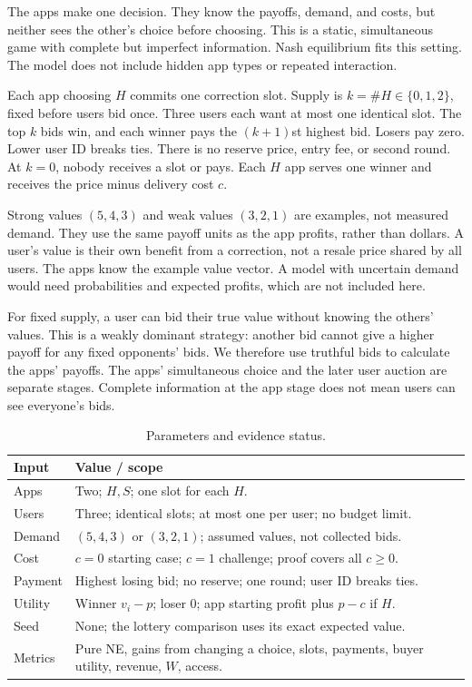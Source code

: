 The apps make one decision. They know the payoffs, demand, and costs, but neither sees the other's choice before choosing. This is a static, simultaneous game with complete but imperfect information. Nash equilibrium fits this setting. The model does not include hidden app types or repeated interaction.

Each app choosing $H$ commits one correction slot. Supply is $k=\#H\in\{0,1,2\}$, fixed before users bid once. Three users each want at most one identical slot. The top $k$ bids win, and each winner pays the $(k+1)$st highest bid. Losers pay zero. Lower user ID breaks ties. There is no reserve price, entry fee, or second round. At $k=0$, nobody receives a slot or pays. Each $H$ app serves one winner and receives the price minus delivery cost $c$.

Strong values $(5,4,3)$ and weak values $(3,2,1)$ are examples, not measured demand. They use the same payoff units as the app profits, rather than dollars. A user's value is their own benefit from a correction, not a resale price shared by all users. The apps know the example value vector. A model with uncertain demand would need probabilities and expected profits, which are not included here.

For fixed supply, a user can bid their true value without knowing the others' values. This is a weakly dominant strategy: another bid cannot give a higher payoff for any fixed opponents' bids. We therefore use truthful bids to calculate the apps' payoffs. The apps' simultaneous choice and the later user auction are separate stages. Complete information at the app stage does not mean users can see everyone's bids.

\begin{table}[h]\centering
\caption{Parameters and evidence status.}
\begin{tabularx}{\columnwidth}{@{}p{1.35cm}Y@{}}\toprule
\textbf{Input} & \textbf{Value / scope}\\\midrule
Apps & Two; $H,S$; one slot for each $H$.\\
Users & Three; identical slots; at most one per user; no budget limit.\\
Demand & $(5,4,3)$ or $(3,2,1)$; assumed values, not collected bids.\\
Cost & $c=0$ starting case; $c=1$ challenge; proof covers all $c\geq0$.\\
Payment & Highest losing bid; no reserve; one round; user ID breaks ties.\\
Utility & Winner $v_i-p$; loser 0; app starting profit plus $p-c$ if $H$.\\
Seed & None; the lottery comparison uses its exact expected value.\\
Metrics & Pure NE, gains from changing a choice, slots, payments, buyer utility, revenue, $W$, access.\\
\bottomrule\end{tabularx}\end{table}

